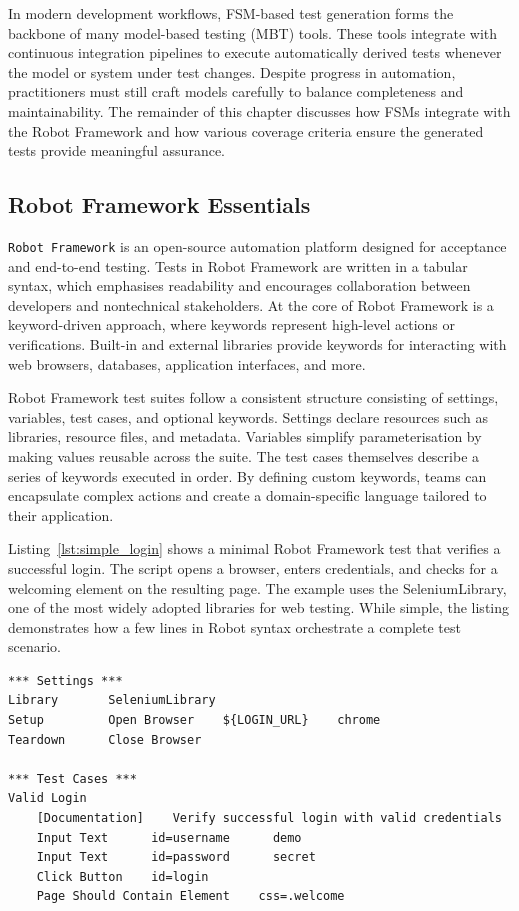 In modern development workflows, FSM-based test generation forms the backbone of
many model-based testing (MBT) tools. These tools integrate with continuous
integration pipelines to execute automatically derived tests whenever the model
or system under test changes. Despite progress in automation, practitioners must
still craft models carefully to balance completeness and maintainability. The
remainder of this chapter discusses how FSMs integrate with the Robot Framework
and how various coverage criteria ensure the generated tests provide meaningful
assurance.

\subsection{Robot Framework Essentials}
\texttt{Robot Framework} is an open-source automation platform designed for acceptance
and end-to-end testing. Tests in Robot Framework are written in a tabular
syntax, which emphasises readability and encourages collaboration between
developers and nontechnical stakeholders\cite{robotframework}. At the core of
Robot Framework is a keyword-driven approach, where keywords represent high-level
actions or verifications. Built-in and external libraries provide keywords for
interacting with web browsers, databases, application interfaces, and more.

Robot Framework test suites follow a consistent structure consisting of settings,
variables, test cases, and optional keywords. Settings declare resources such as
libraries, resource files, and metadata. Variables simplify parameterisation by
making values reusable across the suite. The test cases themselves describe a
series of keywords executed in order. By defining custom keywords, teams can
encapsulate complex actions and create a domain-specific language tailored to
their application.

Listing~\ref{lst:simple_login} shows a minimal Robot Framework test that
verifies a successful login. The script opens a browser, enters credentials, and
checks for a welcoming element on the resulting page. The example uses the
SeleniumLibrary, one of the most widely adopted libraries for web testing. While
simple, the listing demonstrates how a few lines in Robot syntax orchestrate a
complete test scenario.

\begin{lstlisting}[language=RobotFramework, caption={Simple login test in Robot Framework.}, label={lst:simple_login}]
*** Settings ***
Library       SeleniumLibrary
Setup         Open Browser    ${LOGIN_URL}    chrome
Teardown      Close Browser

*** Test Cases ***
Valid Login
    [Documentation]    Verify successful login with valid credentials
    Input Text      id=username      demo
    Input Text      id=password      secret
    Click Button    id=login
    Page Should Contain Element    css=.welcome
\end{lstlisting}

